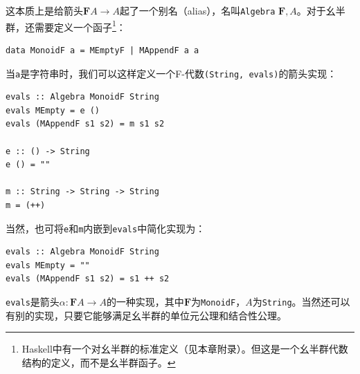 \documentclass[b5paper]{ctexart}
\begin{document}
\begin{example}
这本质上是给箭头$\mathbf{F}A \to A$起了一个别名（alias），名叫\texttt{Algebra} $\mathbf{F}, A$。对于幺半群，还需要定义一个函子\footnote{
Haskell中有一个对幺半群的标准定义（见本章附录）。但这是一个幺半群代数结构的定义，而不是幺半群函子。}：

\begin{lstlisting}
data MonoidF a = MEmptyF | MAppendF a a
\end{lstlisting}

当\texttt{a}是字符串时，我们可以这样定义一个F-代数\texttt{(String, evals)}的箭头实现：

\begin{lstlisting}
evals :: Algebra MonoidF String
evals MEmpty = e ()
evals (MAppendF s1 s2) = m s1 s2

e :: () -> String
e () = ""

m :: String -> String -> String
m = (++)
\end{lstlisting}

当然，也可将\texttt{e}和\texttt{m}内嵌到\texttt{evals}中简化实现为：

\begin{lstlisting}
evals :: Algebra MonoidF String
evals MEmpty = ""
evals (MAppendF s1 s2) = s1 ++ s2
\end{lstlisting}

\texttt{evals}是箭头$\alpha : \mathbf{F}A \to A$的一种实现，其中$\mathbf{F}$为\texttt{MonoidF}，$A$为\texttt{String}。当然还可以有别的实现，只要它能够满足幺半群的单位元公理和结合性公理。
\end{example}
\end{document}
